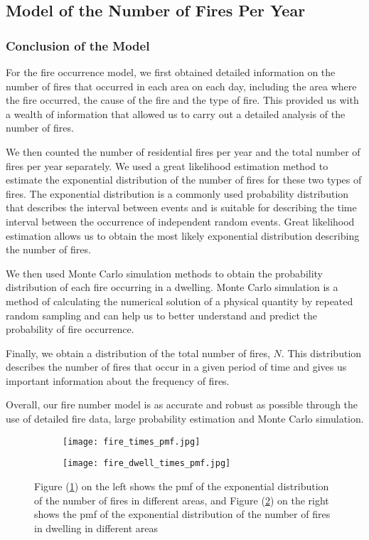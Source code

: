 \documentclass[12pt]{article}  %
\begin{document}
\subsection{Model of the Number of Fires Per Year}
\subsubsection{Conclusion of the Model}
For the fire occurrence model, we first obtained detailed information on the number of 
fires that occurred in each area on each day, including the area where the fire 
occurred, the cause of the fire and the type of fire. This provided us with a wealth 
of information that allowed us to carry out a detailed analysis of the number of fires.

We then counted the number of residential fires per year and the total number of fires 
per year separately. We used a great likelihood estimation method to estimate the exponential 
distribution of the number of fires for these two types of fires. The exponential distribution 
is a commonly used probability distribution that describes the interval between events 
and is suitable for describing the time interval between the occurrence of independent 
random events. Great likelihood estimation allows us to obtain the most likely exponential 
distribution describing the number of fires.

We then used Monte Carlo simulation methods to obtain the probability distribution of 
each fire occurring in a dwelling. Monte Carlo simulation is a method of calculating 
the numerical solution of a physical quantity by repeated random sampling and can 
help us to better understand and predict the probability of fire occurrence.

Finally, we obtain a distribution of the total number of fires, $N$. 
This distribution describes the number of fires that occur in a given 
period of time and gives us important information about the frequency of fires.

Overall, our fire number model is as accurate and robust as possible through 
the use of detailed fire data, large probability estimation and Monte Carlo simulation.

\begin{figure}[htbp]
\centering
\begin{subfigure}[b]{.45\textwidth}
\texttt{[image: fire\_times\_pmf.jpg]}
\caption{}\label{subfig:fireall}
\end{subfigure}
\begin{subfigure}[b]{.45\textwidth}
\texttt{[image: fire\_dwell\_times\_pmf.jpg]}
\caption{}\label{subfig:firedwell}
\end{subfigure}
\caption{Figure (\ref{subfig:fireall}) on the left shows the pmf of the exponential distribution of the number of 
fires in different areas, and Figure (\ref{subfig:firedwell}) on the right shows the pmf of the exponential distribution 
of the number of fires in dwelling in different areas}\label{fig:firepmf}
\end{figure}
\end{document}
